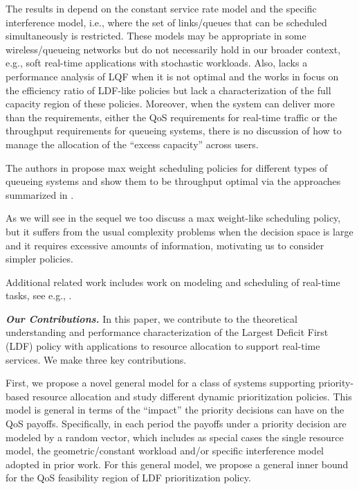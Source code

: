 \documentclass[prodmode,acmtompecs]{acmsmall}
\newcommand{\myComments}[1]{}
\newif\ifextended
\newcommand{\extendedStart}{\ifextended  \myComments{Extended version: }}
\newcommand{\commentEnd}{\myComments{End}}
\begin{document}
The results in \cite{DiW06,JLS07,KWJ13} depend on the constant service rate model and the specific interference model, i.e., where the set of links/queues that can be scheduled simultaneously is restricted. 
These models may be appropriate in some wireless/queueing networks but do not necessarily hold in our broader context, e.g., soft real-time applications with stochastic workloads. Also, \cite{DiW06} lacks a performance analysis of LQF when it is not optimal and the works in \cite{JLS07,KWJ13} focus on the efficiency ratio of LDF-like policies but lack a characterization of the full capacity region of these policies. 
Moreover, when the system can deliver more than the requirements, either the QoS requirements for real-time traffic or the throughput requirements for queueing systems, there is no discussion of how to manage the allocation of the ``excess capacity'' across users. 

The authors in \cite{TaE92,TaE93,MMA99,DaP00,Sto04} propose max weight 
scheduling policies for different types of queueing systems and show them to be throughput optimal 
via the approaches summarized in \cite{DoM94,DoM97,MeT08}. 
\extendedStart
The authors in \cite{Nee09} and \cite{VBY13} further 
characterize the delay of the max weight policy, and study its inefficiency in spatial wireless networks, respectively. 
\commentEnd\fi
As we will see in the sequel we too discuss a max weight-like scheduling policy, but it suffers from the usual complexity problems when the decision space
is large and it requires excessive amounts of information, motivating us to consider simpler policies. 

Additional related work includes work on modeling and scheduling of real-time tasks, see e.g., \cite{SAA04,DaB11,LiI08,ShS02}. 

{\bf \em Our Contributions. }
In this paper, we contribute to the theoretical understanding and performance characterization of the Largest Deficit First (LDF) policy with applications to resource allocation to support real-time services. We make three key contributions. 

First, we propose a novel general model for a class of systems supporting priority-based resource allocation 
and study different dynamic prioritization policies. This model is general in terms of the ``impact'' the priority decisions can have on the QoS payoffs. Specifically, in each period the payoffs under a priority decision are modeled by a random vector, which includes as special cases the single resource model, the geometric/constant workload and/or specific interference model adopted in prior work. 
For this general model, we propose a general inner bound  for the QoS feasibility region of LDF prioritization policy. 
\end{document}
